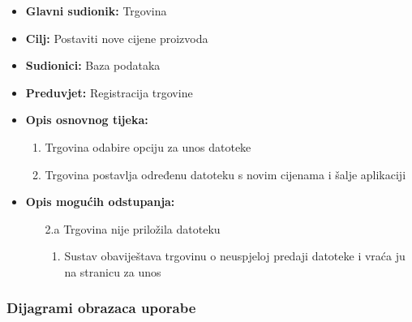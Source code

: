                         \noindent {}
					\begin{itemize}
	
						\item \textbf{Glavni sudionik: }Trgovina
						\item  \textbf{Cilj:} Postaviti nove cijene proizvoda
						\item  \textbf{Sudionici:} Baza podataka
						\item  \textbf{Preduvjet:} Registracija trgovine
						\item  \textbf{Opis osnovnog tijeka:}
						
						\item[] \begin{enumerate}
							\item Trgovina odabire opciju za unos datoteke 
                                \item Trgovina postavlja određenu datoteku s novim cijenama i šalje aplikaciji
						\end{enumerate}

                            \item  \textbf{Opis mogućih odstupanja:}
						
						\item[] \begin{enumerate}
	
							\item[2.a] Trgovina nije priložila datoteku
							\item[] \begin{enumerate}
								
								\item Sustav obaviještava trgovinu o neuspjeloj predaji datoteke i vraća ju na stranicu za unos\\
								
							\end{enumerate}
			
							
						\end{enumerate}
						
					\end{itemize}

                    

                        


     
					
				\subsubsection{Dijagrami obrazaca uporabe}
					
